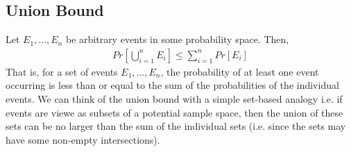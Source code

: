 \documentclass[10pt,a4paper]{article}
\begin{document}
\subsection*{Union Bound}

Let $E_1,\dots,E_n$ be arbitrary events in some probability space. Then,
\begin{align*}
    Pr \left[ \bigcup_{i=1}^n E_i \right] \leq \sum_{i=1}^n Pr[E_i]
\end{align*}
That is, for a set of events $E_1,\dots,E_n$, the probability of at least one event occurring is less than or equal to the sum of the probabilities of the individual events. We can think of the union bound with a simple set-based analogy i.e. if events are viewe as subsets of a potential sample space, then the union of these sets can be no larger than the sum of the individual sets (i.e. since the sets may have some non-empty intersections).




\end{document}
